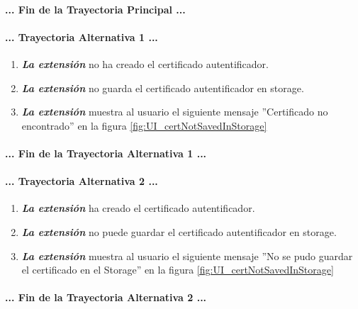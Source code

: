 \documentclass[12pt, a4paper, titlepage]{report}
\begin{document}
				\paragraph{... Fin de la Trayectoria Principal ...}
				
				\paragraph{... Trayectoria Alternativa 1 ...}
				\begin{enumerate}
				    \item \textbf{\textit{La extensión}} no ha creado el certificado autentificador.
					\item \textbf{\textit{La extensión}} no guarda el certificado autentificador en storage. 
					\item \textbf{\textit{La extensión}} muestra al usuario el siguiente mensaje ''Certificado no encontrado'' en la figura \ref{fig:UI_certNotSavedInStorage}
				\end{enumerate}
				\paragraph{... Fin de la Trayectoria Alternativa 1 ...}
				
					\paragraph{... Trayectoria Alternativa 2 ...}
				\begin{enumerate}
				    \item \textbf{\textit{La extensión}} ha creado  el certificado autentificador.
					\item \textbf{\textit{La extensión}} no puede guardar el certificado autentificador en storage. 
					\item \textbf{\textit{La extensión}} muestra al usuario el siguiente mensaje ''No se pudo guardar el certificado en el Storage'' en la figura \ref{fig:UI_certNotSavedInStorage}
				\end{enumerate}
				\paragraph{... Fin de la Trayectoria Alternativa 2 ...}
				
\end{document}
